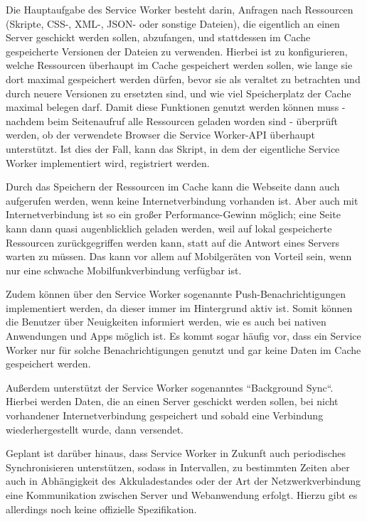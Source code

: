 Die Hauptaufgabe des Service Worker besteht darin, Anfragen nach Ressourcen (Skripte, CSS-, XML-, JSON- oder sonstige Dateien), die eigentlich an einen Server geschickt werden sollen, abzufangen, und stattdessen im Cache gespeicherte Versionen der Dateien zu verwenden. Hierbei ist zu konfigurieren, welche Ressourcen überhaupt im Cache gespeichert werden sollen, wie lange sie dort maximal gespeichert werden dürfen, bevor sie als veraltet zu betrachten und durch neuere Versionen zu ersetzten sind, und wie viel Speicherplatz der Cache maximal belegen darf. Damit diese Funktionen genutzt werden können muss - nachdem beim Seitenaufruf alle Ressourcen geladen worden sind - überprüft werden, ob der verwendete Browser die Service Worker-\acs{API} überhaupt unterstützt. Ist dies der Fall, kann das Skript, in dem der eigentliche Service Worker implementiert wird, registriert werden.

Durch das Speichern der Ressourcen im Cache kann die Webseite dann auch aufgerufen werden, wenn keine Internetverbindung vorhanden ist. Aber auch mit Internetverbindung ist so ein großer Performance-Gewinn möglich; eine Seite kann dann quasi augenblicklich geladen werden, weil auf lokal gespeicherte Ressourcen zurückgegriffen werden kann, statt auf die Antwort eines Servers warten zu müssen. Das kann vor allem auf Mobilgeräten von Vorteil sein, wenn nur eine schwache Mobilfunkverbindung verfügbar ist\cite{ServiceWorker}.

Zudem können über den Service Worker sogenannte Push-Benachrichtigungen implementiert werden, da dieser immer im Hintergrund aktiv ist. Somit können die Benutzer über Neuigkeiten informiert werden, wie es auch bei nativen Anwendungen und Apps möglich ist. Es kommt sogar häufig vor, dass ein Service Worker nur für solche Benachrichtigungen genutzt und gar keine Daten im Cache gespeichert werden.

Außerdem unterstützt der Service Worker sogenanntes ``Background Sync``. Hierbei werden Daten, die an einen Server geschickt werden sollen, bei nicht vorhandener Internetverbindung gespeichert und sobald eine Verbindung wiederhergestellt wurde, dann versendet.

Geplant ist darüber hinaus, dass Service Worker in Zukunft auch periodisches Synchronisieren unterstützen, sodass in Intervallen, zu bestimmten Zeiten aber auch in Abhängigkeit des Akkuladestandes oder der Art der Netzwerkverbindung eine Kommunikation zwischen Server und Webanwendung erfolgt. Hierzu gibt es allerdings noch keine offizielle Spezifikation\cite{SwFuture}.

